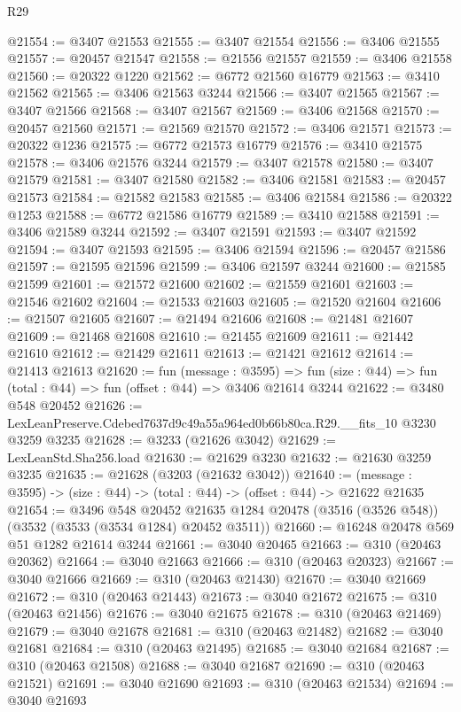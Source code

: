 \begin{lexlean}{R29}
\begin{coremodule}
@21554 := @3407 @21553
@21555 := @3407 @21554
@21556 := @3406 @21555
@21557 := @20457 @21547
@21558 := @21556 @21557
@21559 := @3406 @21558
@21560 := @20322 @1220
@21562 := @6772 @21560 @16779
@21563 := @3410 @21562
@21565 := @3406 @21563 @3244
@21566 := @3407 @21565
@21567 := @3407 @21566
@21568 := @3407 @21567
@21569 := @3406 @21568
@21570 := @20457 @21560
@21571 := @21569 @21570
@21572 := @3406 @21571
@21573 := @20322 @1236
@21575 := @6772 @21573 @16779
@21576 := @3410 @21575
@21578 := @3406 @21576 @3244
@21579 := @3407 @21578
@21580 := @3407 @21579
@21581 := @3407 @21580
@21582 := @3406 @21581
@21583 := @20457 @21573
@21584 := @21582 @21583
@21585 := @3406 @21584
@21586 := @20322 @1253
@21588 := @6772 @21586 @16779
@21589 := @3410 @21588
@21591 := @3406 @21589 @3244
@21592 := @3407 @21591
@21593 := @3407 @21592
@21594 := @3407 @21593
@21595 := @3406 @21594
@21596 := @20457 @21586
@21597 := @21595 @21596
@21599 := @3406 @21597 @3244
@21600 := @21585 @21599
@21601 := @21572 @21600
@21602 := @21559 @21601
@21603 := @21546 @21602
@21604 := @21533 @21603
@21605 := @21520 @21604
@21606 := @21507 @21605
@21607 := @21494 @21606
@21608 := @21481 @21607
@21609 := @21468 @21608
@21610 := @21455 @21609
@21611 := @21442 @21610
@21612 := @21429 @21611
@21613 := @21421 @21612
@21614 := @21413 @21613
@21620 := fun (message : @3595) =>
  fun (size : @44) => fun (total : @44) => fun (offset : @44) => @3406 @21614 @3244
@21622 := @3480 @548 @20452
@21626 := LexLeanPreserve.Cdebed7637d9c49a55a964ed0b66b80ca.R29.__fits_10 @3230 @3259 @3235
@21628 := @3233 (@21626 @3042)
@21629 := LexLeanStd.Sha256.load
@21630 := @21629 @3230
@21632 := @21630 @3259 @3235
@21635 := @21628 (@3203 (@21632 @3042))
@21640 := (message : @3595) -> (size : @44) -> (total : @44) -> (offset : @44) -> @21622 @21635
@21654 := @3496
    @548
    @20452
    @21635
    @1284
    @20478
    (@3516 (@3526 @548))
    (@3532 (@3533 (@3534 @1284) @20452 @3511))
@21660 := @16248 @20478 @569 @51 @1282 @21614 @3244
@21661 := @3040 @20465
@21663 := @310 (@20463 @20362)
@21664 := @3040 @21663
@21666 := @310 (@20463 @20323)
@21667 := @3040 @21666
@21669 := @310 (@20463 @21430)
@21670 := @3040 @21669
@21672 := @310 (@20463 @21443)
@21673 := @3040 @21672
@21675 := @310 (@20463 @21456)
@21676 := @3040 @21675
@21678 := @310 (@20463 @21469)
@21679 := @3040 @21678
@21681 := @310 (@20463 @21482)
@21682 := @3040 @21681
@21684 := @310 (@20463 @21495)
@21685 := @3040 @21684
@21687 := @310 (@20463 @21508)
@21688 := @3040 @21687
@21690 := @310 (@20463 @21521)
@21691 := @3040 @21690
@21693 := @310 (@20463 @21534)
@21694 := @3040 @21693

\end{coremodule}
\end{lexlean}
